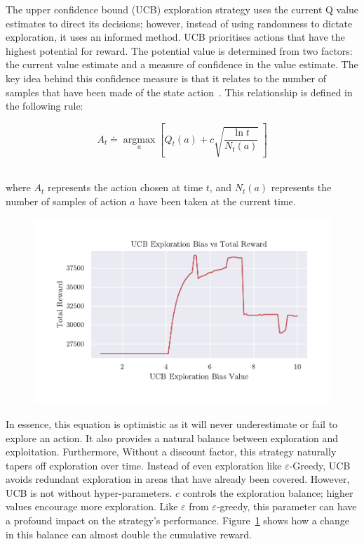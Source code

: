 \documentclass[]{final_report}
\begin{document}
The upper confidence bound (UCB) exploration strategy uses the current Q value estimates to direct its decisions; however, instead of using randomness to dictate exploration, it uses an informed method. UCB prioritises actions that have the highest potential for reward. The potential value is determined from two factors: the current value estimate and a measure of confidence in the value estimate. The key idea behind this confidence measure is that it relates to the number of samples that have been made of the state action~\cite{sutton2018reinforcement}. This relationship is defined in the following rule:


\begin{equation}
  A_t \doteq \underset{a}{\operatorname{argmax}}\left [Q_t(a)+ c\sqrt{\frac{\ln t}{N_t(a)}} \ \right ]
  \label{eqn:ucb}
\end{equation}
~\cite{sutton2018reinforcement}

where $A_t$ represents the action chosen at time $t$, and $N_t(a)$ represents the number of samples of action $a$ have been taken at the current time. 

\begin{figure}[H]
  \centering
  
  \includegraphics[trim={0 1cm 0 1cm},clip,width=\textwidth]{hyper-paramiters/ucb-exploration}
  
  \caption{\label{fig:ucb-exploration-bias}}
\end{figure}


In essence, this equation is optimistic as it will never underestimate or fail to explore an action. It also provides a natural balance between exploration and exploitation. Furthermore, Without a discount factor, this strategy naturally tapers off exploration over time. Instead of even exploration like $\varepsilon$-Greedy, UCB avoids redundant exploration in areas that have already been covered. However, UCB is not without hyper-parameters. $c$ controls the exploration balance; higher values encourage more exploration. Like $\varepsilon$ from $\varepsilon$-greedy, this parameter can have a profound impact on the strategy's performance. Figure~\ref{fig:ucb-exploration-bias} shows how a change in this balance can almost double the cumulative reward. 
\end{document}
